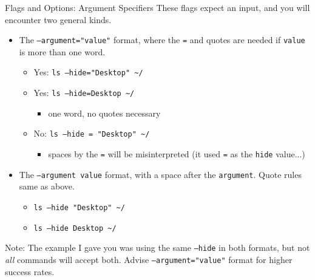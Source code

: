 \begin{frame}[fragile]{Flags and Options: Argument Specifiers}
  These flags expect an input, and you will encounter two general kinds.
  \begin{itemize}
    \item The \texttt{--argument="value"} format, where the \texttt{=} and quotes are needed if \texttt{value} is
          more than one word.
    \begin{itemize}
      \item Yes: \texttt{ls --hide="Desktop" \textasciitilde/}
      \item Yes: \texttt{ls --hide=Desktop \textasciitilde/}
      \begin{itemize}
        \item one word, no quotes necessary
      \end{itemize}
      \item No: \texttt{ls --hide = "Desktop" \textasciitilde/}
      \begin{itemize}
        \item spaces by the \texttt{=} will be misinterpreted (it used \texttt{=} as the \texttt{hide} value...)
      \end{itemize}
    \end{itemize}
    \item The \texttt{--argument value} format, with a space after the \texttt{argument}. Quote rules same as above.
    \begin{itemize}
      \item \texttt{ls --hide "Desktop" \textasciitilde/}
      \item \texttt{ls --hide Desktop \textasciitilde/}
    \end{itemize}
  \end{itemize}
  {\tiny Note: The example I gave you was using the same \texttt{--hide} in both formats, but not \emph{all} commands will
    accept both.  Advise \texttt{--argument="value"} format for higher success rates.}
\end{frame}

